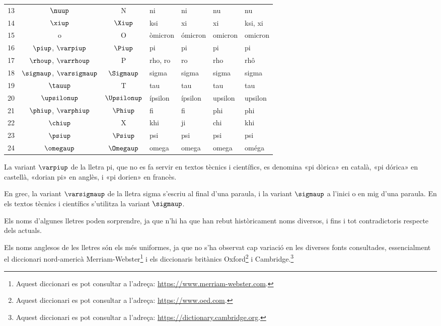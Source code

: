 \begin{center}
\begin{threeparttable}
\begin{tabular}{cccllll}
		13 & $\nuup$ & N & ni & ni &  nu & nu\\
		14 & $\xiup$ & $\Xiup$ & ksi & xi &  xi & ksi, xi\\
		15 & o & O & òmicron & ómicron &  omicron & omicron\\
		16 & $\piup$, $\varpiup$\tnote{\color{blue}(a)} & $\Piup$ & pi & pi &  pi & pi\\
		17 & $\rhoup$, $\varrhoup$ & P & rho, ro & ro &  rho & rhô\\
		18 & $\sigmaup$, $\varsigmaup$\tnote{\color{blue}(b)} & $\Sigmaup$ & sigma & sigma &  sigma &sigma\\
		19 & $\tauup$ & T & tau & tau & tau &tau\\
		20 & $\upsilonup$ & $\Upsilonup$ & ípsilon & ípsilon &  upsilon &upsilon\\
		21 & $\phiup$, $\varphiup$ & $\Phiup$ & fi & fi &  phi & phi\\
		22 & $\chiup$ & X & khi & ji &  chi & khi\\
		23 & $\psiup$ & $\Psiup$ & psi & psi &  psi & psi\\
		24 & $\omegaup$ & $\Omegaup$ & omega & omega &  omega & oméga\\
		\bottomrule[1pt]
	\end{tabular}
	\begin{tablenotes}
		\item[\color{blue}(a)] {\footnotesize La variant $\varpiup$ de la lletra pi, que no es fa servir en textos tècnics i científics, es denomina «pi dòrica» en  català, «pi dórica» en castellà, «dorian pi» en anglès, i «pi dorien» en francès.}
		\item[\color{blue}(b)] {\footnotesize En grec, la variant $\varsigmaup$ de la lletra sigma s'escriu  al final d'una paraula, i la variant $\sigmaup$  a l'inici o en mig d'una paraula. En els textos tècnics i científics s'utilitza  la variant $\sigmaup$.}
	\end{tablenotes}
\end{threeparttable}
\end{center}



Els noms d'algunes lletres poden sorprendre, ja que n'hi ha que han rebut històricament noms
diversos, i fins i tot contradictoris respecte dels actuals.

Els noms anglesos de les lletres són els més uniformes, ja que no
s'ha observat cap variació en les diverses fonts consultades, essencialment el diccionari nord-americà Merriam-Webster\footnote{Aquest diccionari es pot consultar a l'adreça: \href{https://www.merriam-webster.com/}{https://www.merriam-webster.com}.} i els diccionaris britànics Oxford\footnote{Aquest diccionari es pot consultar a l'adreça: \href{https://www.oed.com/}{https://www.oed.com}.} i Cambridge.\footnote{Aquest diccionari es pot consultar a l'adreça: \href{https://dictionary.cambridge.org/}{https://dictionary.cambridge.org}.}

